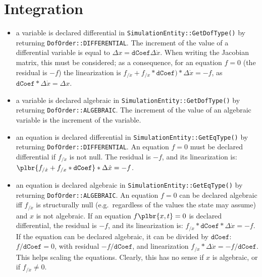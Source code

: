 \documentclass[10pt,fleqn,subeqn]{report}
\begin{document}
\chapter{Integration}

\begin{itemize}

\item[differential variable:] a variable is declared differential
in \texttt{SimulationEntity::GetDofType()} 
by returning \texttt{DofOrder::DIFFERENTIAL}.
The increment of the value of a differential variable is equal 
to $\Delta x=\texttt{dCoef}\Delta \dot{x}$.
When writing the Jacobian matrix, this must be considered;
as a consequence, for an equation $f=0$ (the residual is $-f$)
the linearization is 
$f_{/\dot{x}}+f_{/x}*\texttt{dCoef})*\Delta \dot{x}=-f$, 
as $\texttt{dCoef}*\Delta \dot{x}=\Delta x$.

\item[algebraic variable:] a variable is declared algebraic
in \texttt{SimulationEntity::GetDofType()}
by returning \texttt{DofOrder::ALGEBRAIC}.
The increment of the value of an algebraic variable is the increment 
of the variable.

\item[differential equation:] an equation is declared differential
in \texttt{SimulationEntity::GetEqType()}
by returning \texttt{DofOrder::DIFFERENTIAL}.
An equation $f=0$ must be declared differential if $f_{/\dot{x}}$ is not null.
The residual is $-f$, and its linearization is:
$\plbr{f_{/\dot{x}}+f_{/x}*\texttt{dCoef}}*\Delta \dot{x}=-f$.

\item[algebraic equation:] an equation is declared algebraic
in \texttt{SimulationEntity::GetEqType()}
by returning \texttt{DofOrder::ALGEBRAIC}.
An equation $f=0$ can be declared algebraic iff $f_{/\dot{x}}$ 
is structurally null (e.g.\ regardless of the values the state may assume) 
and $x$ is not algebraic.
If an equation $f\plbr{x,t}=0$ is declared differential,
the residual is $-f$, and its linearization is:
$f_{/x}*\texttt{dCoef}*\Delta \dot{x}=-f$.
If the equation can be declared algebraic, it can be divided by $\texttt{dCoef}$:
$f/\texttt{dCoef}=0$, with residual $-f/\texttt{dCoef}$,
and linearization $f_{/x}*\Delta \dot{x} = -f/\texttt{dCoef}$.
This helps scaling the equations.
Clearly, this has no sense if $x$ is algebraic,
or if $f_{/\dot{x}} \neq 0$.

\end{itemize}
\end{document}
